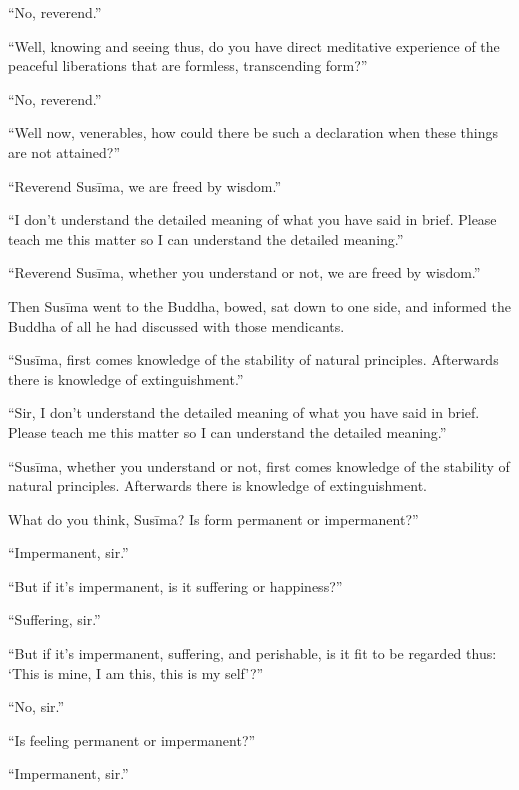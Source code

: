 \documentclass[12pt,openany]{book}%
\begin{document}
“No, reverend.” 

“Well, knowing and seeing thus, do you have direct meditative experience of the peaceful liberations that are formless, transcending form?” 

“No, reverend.” 

“Well now, venerables, how could there be such a declaration when these things are not attained?” 

“Reverend \textsanskrit{Susīma}, we are freed by wisdom.” 

“I don’t understand the detailed meaning of what you have said in brief. Please teach me this matter so I can understand the detailed meaning.” 

“Reverend \textsanskrit{Susīma}, whether you understand or not, we are freed by wisdom.” 

Then \textsanskrit{Susīma} went to the Buddha, bowed, sat down to one side, and informed the Buddha of all he had discussed with those mendicants. 

“\textsanskrit{Susīma}, first comes knowledge of the stability of natural principles. Afterwards there is knowledge of extinguishment.” 

“Sir, I don’t understand the detailed meaning of what you have said in brief. Please teach me this matter so I can understand the detailed meaning.” 

“\textsanskrit{Susīma}, whether you understand or not, first comes knowledge of the stability of natural principles. Afterwards there is knowledge of extinguishment. 

What do you think, \textsanskrit{Susīma}? Is form permanent or impermanent?” 

“Impermanent, sir.” 

“But if it’s impermanent, is it suffering or happiness?” 

“Suffering, sir.” 

“But if it’s impermanent, suffering, and perishable, is it fit to be regarded thus: ‘This is mine, I am this, this is my self’?” 

“No, sir.” 

“Is feeling permanent or impermanent?” 

“Impermanent, sir.” 
\end{document}
